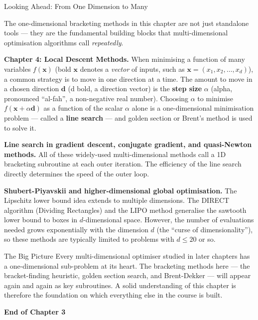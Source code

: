 \documentclass[aspectratio=169,10pt]{beamer}
\begin{document}
\begin{frame}[allowframebreaks]{Looking Ahead: From One Dimension to Many}

  The one-dimensional bracketing methods in this chapter are not just
  standalone tools --- they are the fundamental building blocks that
  multi-dimensional optimisation algorithms call \emph{repeatedly}.

  \textbf{Chapter 4: Local Descent Methods.}
  When minimising a function of many variables $f(\mathbf{x})$ (bold
  $\mathbf{x}$ denotes a \emph{vector} of inputs, such as
  $\mathbf{x} = (x_1, x_2, \ldots, x_d)$), a common strategy is to move
  in one direction at a time.  The amount to move in a chosen direction
  $\mathbf{d}$ (d bold, a direction vector) is the \textbf{step size}
  $\alpha$ (alpha, pronounced ``al-fah'', a non-negative real number).
  Choosing $\alpha$ to minimise $f(\mathbf{x} + \alpha \mathbf{d})$
  as a function of the scalar $\alpha$ alone is a one-dimensional
  minimisation problem --- called a \textbf{line search} --- and golden
  section or Brent's method is used to solve it.

  \textbf{Line search in gradient descent, conjugate gradient, and
  quasi-Newton methods.}
  All of these widely-used multi-dimensional methods call a 1D bracketing
  subroutine at each outer iteration.  The efficiency of the line search
  directly determines the speed of the outer loop.

  \textbf{Shubert-Piyavskii and higher-dimensional global optimisation.}
  The Lipschitz lower bound idea extends to multiple dimensions.  The
  DIRECT algorithm (Dividing Rectangles) and the LIPO method generalise
  the sawtooth lower bound to boxes in $d$-dimensional space.  However,
  the number of evaluations needed grows exponentially with the dimension
  $d$ (the ``curse of dimensionality''), so these methods are typically
  limited to problems with $d \le 20$ or so.

  \begin{alertblock}{The Big Picture}
    Every multi-dimensional optimiser studied in later chapters has a
    one-dimensional sub-problem at its heart.  The bracketing methods
    here --- the bracket-finding heuristic, golden section search, and
    Brent-Dekker --- will appear again and again as key subroutines.
    A solid understanding of this chapter is therefore the foundation
    on which everything else in the course is built.
  \end{alertblock}

  \bigskip
  \begin{center}
    \Large\textbf{End of Chapter 3}
  \end{center}

\end{frame}
\end{document}
